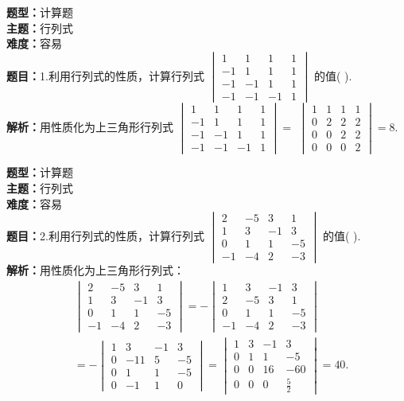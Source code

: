 \documentclass{ctexart}
\newenvironment{question}[5]{%
	\noindent\textbf{题型：}#1\\
	\textbf{主题：}#2\\
	\textbf{难度：}#3\\
	\textbf{题目：}#4\\
	\textbf{解析：}#5\\
	\vspace{1em}
}{}
\begin{document}
	
	\begin{question}
		{计算题}
		{行列式}
		{容易}
		{1.利用行列式的性质，计算行列式 $\begin{vmatrix}1 & 1 & 1 & 1 \\ -1 & 1 & 1 & 1 \\ -1 & -1 & 1 & 1 \\ -1 & -1 & -1 & 1\end{vmatrix}$ 的值(  ).}
		{用性质化为上三角形行列式 $\begin{vmatrix}1 & 1 & 1 & 1 \\ -1 & 1 & 1 & 1 \\ -1 & -1 & 1 & 1 \\ -1 & -1 & -1 & 1\end{vmatrix}=$ $\begin{vmatrix}1 & 1 & 1 & 1 \\ 0 & 2 & 2 & 2 \\ 0 & 0 & 2 & 2 \\ 0 & 0 & 0 & 2\end{vmatrix}=8$.}
	\end{question}	
	
	
	\begin{question}
		{计算题}
		{行列式}
		{容易}
		{2.利用行列式的性质，计算行列式 $\begin{vmatrix}2 & -5 & 3 & 1 \\ 1 & 3 & -1 & 3 \\ 0 & 1 & 1 & -5 \\ -1 & -4 & 2 & -3\end{vmatrix}$ 的值(  ).}
		{用性质化为上三角形行列式：
			\[
			\begin{aligned}
				&\begin{vmatrix}
					2 & -5 & 3 & 1 \\
					1 & 3 & -1 & 3 \\
					0 & 1 & 1 & -5 \\
					-1 & -4 & 2 & -3
				\end{vmatrix}
				= -\begin{vmatrix}
					1 & 3 & -1 & 3 \\
					2 & -5 & 3 & 1 \\
					0 & 1 & 1 & -5 \\
					-1 & -4 & 2 & -3
				\end{vmatrix} \\
				&= -\begin{vmatrix}
					1 & 3 & -1 & 3 \\
					0 & -11 & 5 & -5 \\
					0 & 1 & 1 & -5 \\
					0 & -1 & 1 & 0
				\end{vmatrix}
				= \begin{vmatrix}
					1 & 3 & -1 & 3 \\
					0 & 1 & 1 & -5 \\
					0 & 0 & 16 & -60 \\
					0 & 0 & 0 & \frac{5}{2}
				\end{vmatrix} = 40.
			\end{aligned}
			\]}
	\end{question}
	
\end{document}
